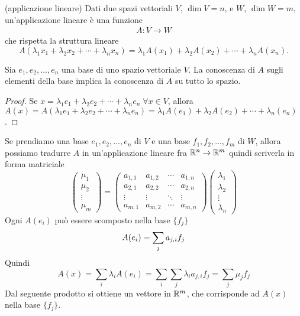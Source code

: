 \begin{definition}{(applicazione lineare)}
Dati due spazi vettoriali $V$, $\dim{V} = n$, e $W$, $\dim{W} = m$, un'applicazione lineare è una funzione 
\begin{align*}
A : V \longrightarrow W
\end{align*} 
che rispetta la struttura lineare
\begin{equation*}
A(\lambda_1 x_1 + \lambda_2 x_2 + \cdots + \lambda_n x_n) = \lambda_1 A(x_1) + \lambda_2 A(x_2) + \cdots + \lambda_n A(x_n).
\end{equation*}
\end{definition}
\begin{proposition}
Sia $e_1, e_2, \ldots, e_n$ una base di uno spazio vettoriale $V$. La conoscenza di $A$ sugli elementi della base implica la conoscenza di $A$ su tutto lo spazio.
\end{proposition}

\begin{proof}
Se $x = \lambda_1 e_1 + \lambda_2 e_2 + \cdots + \lambda_n e_n \; \forall x \in V$, allora $A(x) = A(\lambda_1 e_1 + \lambda_2 e_2 + \cdots + \lambda_n e_n) = \lambda_1 A(e_1) + \lambda_2 A(e_2) + \cdots + \lambda_n (e_n)$.
\end{proof} 
Se prendiamo una base $e_1, e_2, \ldots, e_n$ di $V$ e una base $f_1, f_2, \ldots, f_m$ di $W$, allora possiamo tradurre $A$ in un'applicazione lineare fra $\mathbb R^n \rightarrow \mathbb R^m$ quindi scriverla in forma matriciale
\begin{equation*}
\begin{pmatrix}
\mu_1 \\
\mu_2 \\
\vdots \\
\mu_m
\end{pmatrix}
=
\begin{pmatrix}
a_{1,1} & a_{1,2} & \cdots & a_{1,n} \\
a_{2,1} & a_{2,2} & \cdots & a_{2,n} \\
\vdots  & \vdots  & \ddots & \vdots  \\
a_{m,1} & a_{m,2} & \cdots & a_{m,n}
\end{pmatrix}
\begin{pmatrix}
\lambda_1 \\
\lambda_2 \\
\vdots \\
\lambda_n
\end{pmatrix}
\end{equation*}
Ogni $A(e_i)$ può essere scomposto nella base $\{f_j\}$
\begin{equation*}
A(e_i) = \sum_j{a_{j,i} f_j} \\
\end{equation*}
Quindi
\begin{equation*}
A(x) = \sum_i{\lambda_i A(e_i)} = \sum_i\sum_j{\lambda_i a_{j,i} f_j} = \sum_j{\mu_j f_j}
\end{equation*}
Dal seguente prodotto si ottiene un vettore in $\mathbb R^m$, che corrisponde ad $A(x)$ nella base $\{f_j\}$.